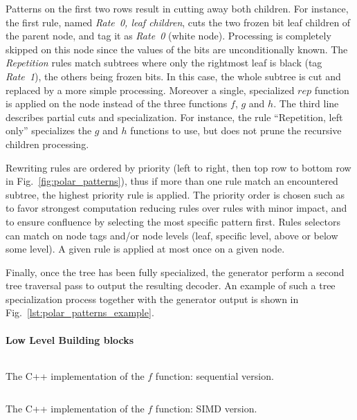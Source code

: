 Patterns on the first two rows result in cutting away both children. For
instance, the first rule, named \emph{Rate~0, leaf children}, cuts the two
frozen bit leaf children of the parent node, and tag it as \emph{Rate~0} (white
node). Processing is completely skipped on this node since the values of the
bits are unconditionally known. The \emph{Repetition} rules match subtrees where
only the rightmost leaf is black (tag \emph{Rate~1}), the others being frozen
bits. In this case, the whole subtree is cut and replaced by a more simple
processing. Moreover a single, specialized $rep$ function is applied on the node
instead of the three functions $f$, $g$ and $h$. The third line describes
partial cuts and specialization. For instance, the rule ``Repetition, left
only'' specializes the $g$ and $h$ functions to use, but does not prune the
recursive children processing.

Rewriting rules are ordered by priority (left to right, then top row to bottom
row in Fig.~\ref{fig:polar_patterns}), thus if more than one rule match an
encountered subtree, the highest priority rule is applied. The priority order is
chosen such as to favor strongest computation reducing rules over rules with
minor impact, and to ensure confluence by selecting the most specific pattern
first. Rules selectors can match on node tags and/or node levels (leaf, specific
level, above or below some level). A given rule is applied at most once on a
given node.

Finally, once the tree has been fully specialized, the generator perform a
second tree traversal pass to output the resulting decoder. An example of such a
tree specialization process together with the generator output is shown in
Fig.~\ref{lst:polar_patterns_example}.

\paragraph{Low Level Building blocks}
\label{sec:implem}

\begin{listing}
  \inputminted[frame=lines,linenos]{C++}{main/chapter2/src/polar/f_seq.cpp}
  \caption{The C++ implementation of the $f$ function: sequential version.}
  \label{lst:polar_f_seq}
\end{listing}

\begin{listing}
  \inputminted[frame=lines,linenos]{C++}{main/chapter2/src/polar/f_simd.cpp}
  \caption{The C++ implementation of the $f$ function: SIMD version.}
  \label{lst:polar_f_simd}
\end{listing}

